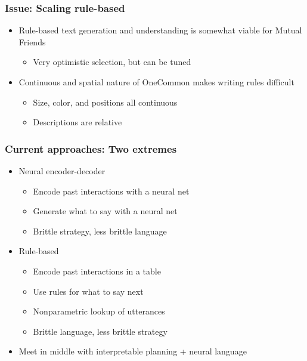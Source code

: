 \documentclass{beamer}
\begin{document}
\begin{frame}
\frametitle{Issue: Scaling rule-based}
\begin{itemize}
\item Rule-based text generation and understanding is somewhat viable for Mutual Friends
    \begin{itemize}
    \item Very optimistic selection, but can be tuned
    \end{itemize}
\item Continuous and spatial nature of OneCommon makes writing rules difficult
    \begin{itemize}
    \item Size, color, and positions all continuous
    \item Descriptions are relative
    \end{itemize}
\end{itemize}
\end{frame}

\begin{frame}
\frametitle{Current approaches: Two extremes}
\begin{itemize}
\item Neural encoder-decoder
    \begin{itemize}
    \item Encode past interactions with a neural net
    \item Generate what to say with a neural net
    \item Brittle strategy, less brittle language
    \end{itemize}
\item Rule-based
    \begin{itemize}
    \item Encode past interactions in a table
    \item Use rules for what to say next
    \item Nonparametric lookup of utterances
    \item Brittle language, less brittle strategy
    \end{itemize}
\item Meet in middle with interpretable planning + neural language
\end{itemize}
\end{frame}
\end{document}
